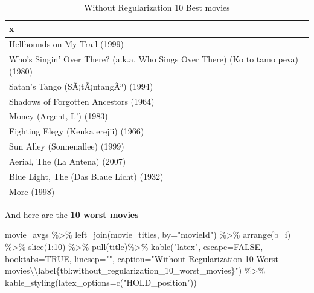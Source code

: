 \documentclass[
]{article}
\newenvironment{Shaded}{}{}
\newcommand{\AttributeTok}[1]{\textcolor[rgb]{0.49,0.56,0.16}{#1}}
\newcommand{\ConstantTok}[1]{\textcolor[rgb]{0.53,0.00,0.00}{#1}}
\newcommand{\DecValTok}[1]{\textcolor[rgb]{0.25,0.63,0.44}{#1}}
\newcommand{\FunctionTok}[1]{\textcolor[rgb]{0.02,0.16,0.49}{#1}}
\newcommand{\NormalTok}[1]{#1}
\newcommand{\SpecialCharTok}[1]{\textcolor[rgb]{0.25,0.44,0.63}{#1}}
\newcommand{\StringTok}[1]{\textcolor[rgb]{0.25,0.44,0.63}{#1}}
\begin{document}
\begin{table}[H]

\caption{\label{tab:reg_1_m_3}Without Regularization 10 Best movies\label{tbl:without_regularization_10_best_movies}}
\centering
\begin{tabular}[t]{l}
\toprule
x\\
\midrule
Hellhounds on My Trail (1999)\\
Who's Singin' Over There? (a.k.a. Who Sings Over There) (Ko to tamo peva) (1980)\\
Satan's Tango (SÃ¡tÃ¡ntangÃ³) (1994)\\
Shadows of Forgotten Ancestors (1964)\\
Money (Argent, L') (1983)\\
Fighting Elegy (Kenka erejii) (1966)\\
Sun Alley (Sonnenallee) (1999)\\
Aerial, The (La Antena) (2007)\\
Blue Light, The (Das Blaue Licht) (1932)\\
More (1998)\\
\bottomrule
\end{tabular}
\end{table}

And here are the \textbf{10 worst movies}

\begin{Shaded}
\begin{Highlighting}[]
\NormalTok{movie\_avgs }\SpecialCharTok{\%\textgreater{}\%} \FunctionTok{left\_join}\NormalTok{(movie\_titles, }\AttributeTok{by=}\StringTok{"movieId"}\NormalTok{) }\SpecialCharTok{\%\textgreater{}\%}
  \FunctionTok{arrange}\NormalTok{(b\_i) }\SpecialCharTok{\%\textgreater{}\%} 
  \FunctionTok{slice}\NormalTok{(}\DecValTok{1}\SpecialCharTok{:}\DecValTok{10}\NormalTok{)  }\SpecialCharTok{\%\textgreater{}\%} 
  \FunctionTok{pull}\NormalTok{(title)}\SpecialCharTok{\%\textgreater{}\%} 
  \FunctionTok{kable}\NormalTok{(}\StringTok{"latex"}\NormalTok{, }\AttributeTok{escape=}\ConstantTok{FALSE}\NormalTok{, }\AttributeTok{booktabs=}\ConstantTok{TRUE}\NormalTok{, }\AttributeTok{linesep=}\StringTok{""}\NormalTok{, }\AttributeTok{caption=}\StringTok{"Without Regularization 10 Worst movies}\SpecialCharTok{\textbackslash{}\textbackslash{}}\StringTok{label\{tbl:without\_regularization\_10\_worst\_movies\}"}\NormalTok{) }\SpecialCharTok{\%\textgreater{}\%}
    \FunctionTok{kable\_styling}\NormalTok{(}\AttributeTok{latex\_options=}\FunctionTok{c}\NormalTok{(}\StringTok{"HOLD\_position"}\NormalTok{))}
\end{Highlighting}
\end{Shaded}
\end{document}
